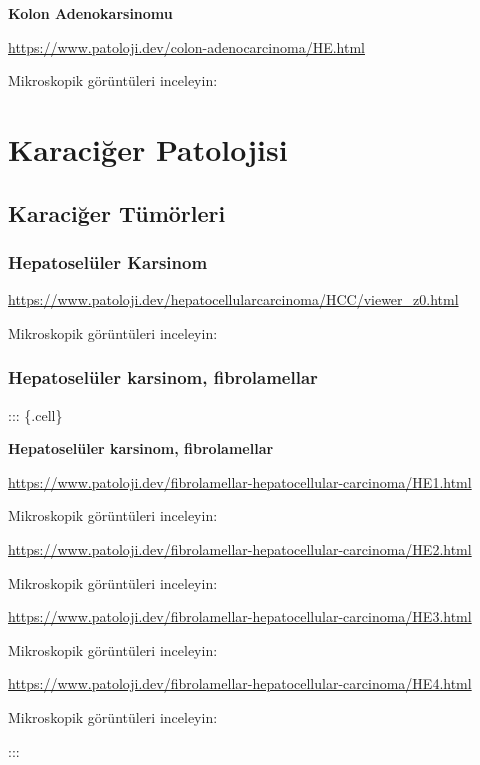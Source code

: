 \documentclass[
  letterpaper,
  DIV=11,
  numbers=noendperiod]{scrreprt}
\begin{document}
\textbf{Kolon Adenokarsinomu}

\url{https://www.patoloji.dev/colon-adenocarcinoma/HE.html}

Mikroskopik görüntüleri inceleyin:

\part{Karaciğer Patolojisi}

\hypertarget{karaciux11fer-tuxfcmuxf6rleri}{%
\chapter{Karaciğer Tümörleri}\label{karaciux11fer-tuxfcmuxf6rleri}}

\hypertarget{hepatoseluxfcler-karsinom}{%
\section{Hepatoselüler Karsinom}\label{hepatoseluxfcler-karsinom}}

\url{https://www.patoloji.dev/hepatocellularcarcinoma/HCC/viewer_z0.html}

Mikroskopik görüntüleri inceleyin:

\hypertarget{hepatoseluxfcler-karsinom-fibrolamellar}{%
\section{Hepatoselüler karsinom,
fibrolamellar}\label{hepatoseluxfcler-karsinom-fibrolamellar}}

::: \{.cell\}

\textbf{Hepatoselüler karsinom, fibrolamellar}

\url{https://www.patoloji.dev/fibrolamellar-hepatocellular-carcinoma/HE1.html}

Mikroskopik görüntüleri inceleyin:

\url{https://www.patoloji.dev/fibrolamellar-hepatocellular-carcinoma/HE2.html}

Mikroskopik görüntüleri inceleyin:

\url{https://www.patoloji.dev/fibrolamellar-hepatocellular-carcinoma/HE3.html}

Mikroskopik görüntüleri inceleyin:

\url{https://www.patoloji.dev/fibrolamellar-hepatocellular-carcinoma/HE4.html}

Mikroskopik görüntüleri inceleyin:

:::
\end{document}
